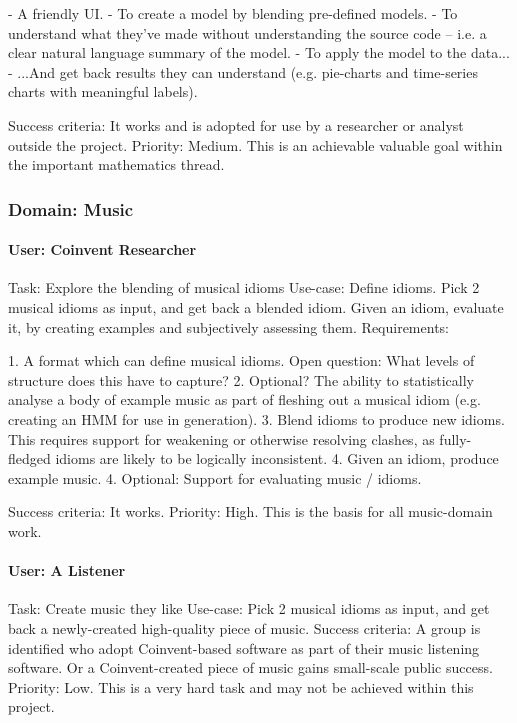 \documentclass[10pt]{article}
\begin{document}
\begin{appendices}
 - A friendly UI.
 - To create a model by blending pre-defined models.
 - To understand what they've made without understanding the source code -- i.e. a clear natural language summary of the model.
 - To apply the model to the data...
 - ...And get back results they can understand (e.g. pie-charts and time-series charts with meaningful labels).

Success criteria: It works and is adopted for use by a researcher or analyst outside the project.   
Priority: Medium. This is an achievable valuable goal within the important mathematics thread.


\subsubsection{Domain: Music}

\paragraph{User: Coinvent Researcher}
Task: Explore the blending of musical idioms      
Use-case: Define idioms. Pick 2 musical idioms as input, and get back a blended idiom. Given an idiom, evaluate it, by creating examples and subjectively assessing them.   
Requirements: 

1. A format which can define musical idioms. Open question: What levels of structure does this have to capture?
2. Optional? The ability to statistically analyse a body of example music as part of fleshing out a musical idiom (e.g. creating an HMM for use in generation).
3. Blend idioms to produce new idioms. This requires support for weakening or otherwise resolving clashes, as fully-fledged idioms are likely to be logically inconsistent.
4. Given an idiom, produce example music.
4. Optional: Support for evaluating music / idioms.

Success criteria: It works.       
Priority: High. This is the basis for all music-domain work.
 
\paragraph{User: A Listener}
Task: Create music they like      
Use-case: Pick 2 musical idioms as input, and get back a newly-created high-quality piece of music.
Success criteria: A group is identified who adopt Coinvent-based software as part of their music listening software. Or a Coinvent-created piece of music gains small-scale public success.   
Priority: Low. This is a very hard task and may not be achieved within this project.
 

\end{appendices}
\end{document}
